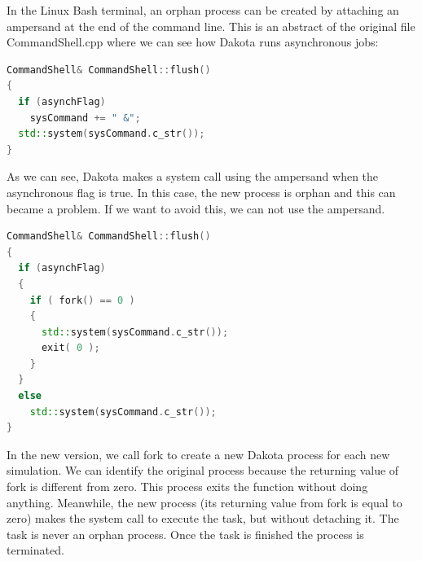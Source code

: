 \documentclass[12pt,a4paper,article]{memoir}
\begin{document}
In the Linux Bash terminal, an orphan process can be created by attaching an ampersand at the end of the command line. This is an abstract of the original file CommandShell.cpp where we can see how Dakota runs asynchronous jobs:

\begin{lstlisting}[style=MyCodeStyle,language=C++]
CommandShell& CommandShell::flush()
{
  if (asynchFlag)
    sysCommand += " &";
  std::system(sysCommand.c_str());
}
\end{lstlisting}

As we can see, Dakota makes a system call using the ampersand when the asynchronous flag is true. In this case, the new process is orphan and this can became a problem. If we want to avoid this, we can not use the ampersand.

\begin{lstlisting}[style=MyCodeStyle,language=C++]
CommandShell& CommandShell::flush()
{
  if (asynchFlag)
  {
    if ( fork() == 0 )
    {
      std::system(sysCommand.c_str());
      exit( 0 );
    }
  }
  else
    std::system(sysCommand.c_str());
}
\end{lstlisting}

In the new version, we call fork to create a new Dakota process for each new simulation. We can identify the original process because the returning value of fork is different from zero. This process exits the function without doing anything. Meanwhile, the new process (its returning value from fork is equal to zero) makes the system call to execute the task, but without detaching it. The task is never an orphan process. Once the task is finished the process is terminated.
\end{document}
